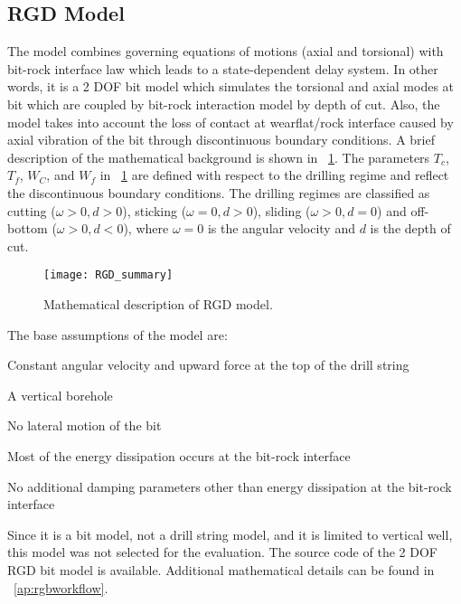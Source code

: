 \subsection{RGD Model}
The model combines governing equations of motions (axial and torsional) with bit-rock interface law which leads to a state-dependent delay system. In other words, it is a 2 DOF bit model which simulates the torsional and axial modes at bit which are coupled by bit-rock interaction model by depth of cut. Also, the model takes into account the loss of contact at wearflat/rock interface caused by axial vibration of the bit through discontinuous boundary conditions.  A brief description of the mathematical background is shown in \figurename~\ref{figure_RGD_Summary}. The parameters $T_c$, $T_f$, $W_C$, and $W_f$ in \figurename~\ref{figure_RGD_Summary} are defined with respect to the drilling regime and reflect the discontinuous boundary conditions. The drilling regimes are classified as cutting ($\omega>0, d>0$), sticking ($\omega=0, d>0$), sliding ($\omega>0, d=0$) and off-bottom ($\omega>0, d<0$), where $\omega=0$ is the angular velocity and $d$ is the depth of cut.
\begin{figure}
  \centering
  \texttt{[image: RGD\_summary]}
  \caption[Mathematical description of RGD model]{Mathematical description of RGD model.}\label{figure_RGD_Summary}
\end{figure}
The base assumptions of the model are:
\begin{bulletedlist}
	\item Constant angular velocity and upward force at the top of the drill string
	\item A vertical borehole
	\item No lateral motion of the bit
	\item Most of the energy dissipation occurs at the bit-rock interface
    \item No additional damping parameters other than energy dissipation at the bit-rock interface
\end{bulletedlist}

Since it is a bit model, not a drill string model, and it is limited to vertical well, this model was not selected for the evaluation. The source code of the 2 DOF RGD bit model is available.  Additional mathematical details can be found in \appendixname~\ref{ap:rgbworkflow}. 

